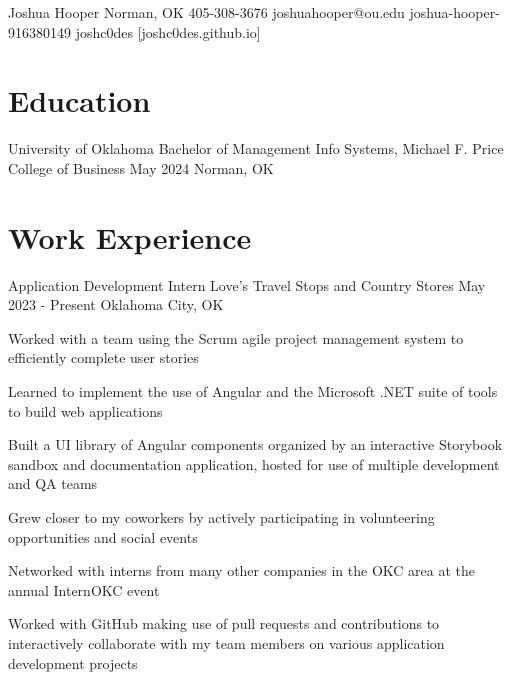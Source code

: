 \documentclass[letterpaper]{resumeconfig}
\begin{document}
\Header
    {Joshua Hooper} %
    {Norman, OK} %
    {405-308-3676} %
    {joshuahooper@ou.edu} %
    {joshua-hooper-916380149} %
    {joshc0des} %
    [joshc0des.github.io] %


\section{Education}

\Education
    {University of Oklahoma} %
    {Bachelor of Management Info Systems, Michael F. Price College of Business} %
    {May 2024} %
    {Norman, OK} %


\section{Work Experience}

\WorkExperience
    {Application Development Intern} %
    {Love's Travel Stops and Country Stores} %
    {May 2023 - Present} %
    {Oklahoma City, OK} %
    {
        \item Worked with a team using the Scrum agile project management system to efficiently complete user stories
        \item Learned to implement the use of Angular and the Microsoft .NET suite of tools to build web applications
        \item Built a UI library of Angular components organized by an interactive Storybook sandbox and documentation application, hosted for use of multiple development and QA teams
        \item Grew closer to my coworkers by actively participating in volunteering opportunities and social events
        \item Networked with interns from many other companies in the OKC area at the annual InternOKC event
        \item Worked with GitHub making use of pull requests and contributions to interactively collaborate with my team members on various application development projects
    }
\end{document}
